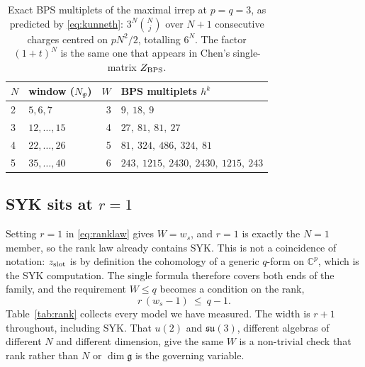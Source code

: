 \documentclass[10pt]{article}
\newcommand{\su}{\mathfrak{su}}
\newcommand{\g}{\mathfrak{g}}
\begin{document}
\begin{table}[t]\centering\small
\begin{tabular}{llrl}
\toprule
$N$ & window ($N_\Psi$) & $W$ & BPS multiplets $h^k$\\
\midrule
2 & $5,6,7$ & 3 & $9,\ 18,\ 9$\\
3 & $12,\dots,15$ & 4 & $27,\ 81,\ 81,\ 27$\\
4 & $22,\dots,26$ & 5 & $81,\ 324,\ 486,\ 324,\ 81$\\
5 & $35,\dots,40$ & 6 & $243,\ 1215,\ 2430,\ 2430,\ 1215,\ 243$\\
\bottomrule
\end{tabular}
\caption{Exact BPS multiplets of the maximal irrep at $p=q=3$, as predicted by \eqref{eq:kunneth}: $3^N\binom Nj$
over $N+1$ consecutive charges centred on $pN^2/2$, totalling $6^N$. The factor $(1+t)^N$ is the same one that
appears in Chen's single-matrix $Z_{\rm BPS}$.}
\label{tab:profiles}
\end{table}

\subsection{SYK sits at $r=1$}

Setting $r=1$ in \eqref{eq:ranklaw} gives $W=w_s$, and $r=1$ is exactly the $N=1$ member, so the rank law already
contains SYK. This is not a coincidence of notation: $z_{\rm slot}$ is by definition the cohomology of a generic
$q$-form on $\mathbb C^p$, which is the SYK computation. The single formula therefore covers both ends of the
family, and the requirement $W\le q$ becomes a condition on the rank,
\begin{equation}
r\,(w_s-1)\ \le\ q-1 .
\label{eq:conc-rank}
\end{equation}
Table~\ref{tab:rank} collects every model we have measured. The width is $r+1$ throughout, including SYK. That
$u(2)$ and $\su(3)$, different algebras of different $N$ and different dimension, give the same $W$ is a
non-trivial check that rank rather than $N$ or $\dim\g$ is the governing variable.
\end{document}
